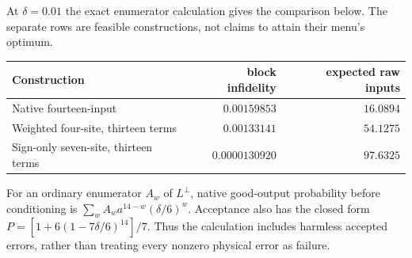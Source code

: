 At $\delta=0.01$ the exact enumerator calculation gives the comparison below.
The separate rows are feasible constructions, not claims to attain their
menu's optimum.
\begin{center}
\begin{tabular}{lrr}
\toprule
Construction & block infidelity & expected raw inputs\\
\midrule
Native fourteen-input & $0.00159853$ & $16.0894$\\
Weighted four-site, thirteen terms & $0.00133141$ & $54.1275$\\
Sign-only seven-site, thirteen terms & $0.0000130920$ & $97.6325$\\
\bottomrule
\end{tabular}
\end{center}
For an ordinary enumerator $A_w$ of $L^\perp$, native good-output probability
before conditioning is $\sum_w A_wa^{14-w}(\delta/6)^w$.
Acceptance also has the closed form
$P=[1+6(1-7\delta/6)^{14}]/7$. Thus the calculation includes harmless
accepted errors, rather than treating every nonzero physical error as failure.
